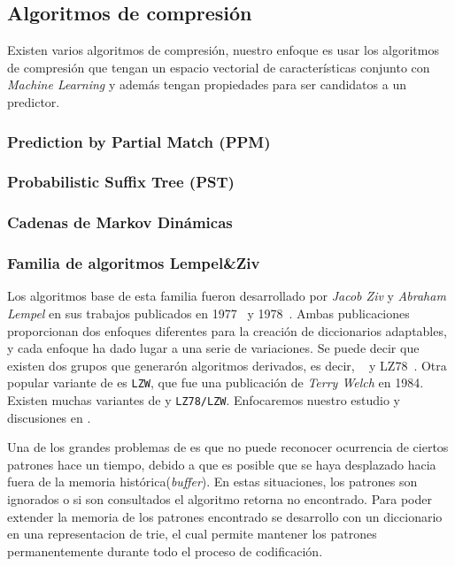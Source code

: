 \uncm
\subsection{Algoritmos de compresión}

Existen varios algoritmos de compresión, nuestro enfoque es usar los algoritmos de compresión que tengan un espacio vectorial de características conjunto con \emph{Machine Learning} y además tengan propiedades para ser candidatos a un predictor. 


\subsubsection{Prediction by Partial Match (PPM)}
	
 
\subsubsection{Probabilistic Suffix Tree (PST)}
 	

\subsubsection{Cadenas de Markov Dinámicas}
  	
 


\subsubsection{Familia de algoritmos Lempel\&Ziv}\label{ch2:sec-lzfamily}

 
Los algoritmos base de esta familia fueron desarrollado por \emph{Jacob Ziv} y \emph{Abraham Lempel} en sus trabajos publicados en 1977~\cite{ZivLempel1977} y 1978~\cite{ZivLempel1978}. Ambas publicaciones proporcionan dos enfoques diferentes para la creación de diccionarios adaptables, y cada enfoque ha dado lugar a una serie de variaciones. Se puede decir que existen dos grupos que generarón algoritmos derivados, es decir, \lzSieteSiete~\cite{ZivLempel1977} y LZ78~\cite{ZivLempel1978}. Otra popular variante  de \lzSieteOcho es \texttt{LZW}, que fue una publicación de \emph{Terry Welch} en 1984. Existen muchas variantes de \lzSieteSiete y \texttt{LZ78/LZW}. Enfocaremos nuestro estudio y discusiones en \lzSieteOcho. 


Una de los grandes problemas de \lzSieteSiete es que no puede reconocer ocurrencia de ciertos patrones hace un tiempo, debido a que es posible que se haya desplazado hacia fuera de la memoria histórica(\emph{buffer}). En estas situaciones, los patrones son ignorados o si son consultados el algoritmo retorna no encontrado. Para poder extender la memoria de los patrones encontrado se desarrollo \lzSieteOcho con un diccionario en una representacion de trie, el cual permite mantener los patrones permanentemente durante todo el proceso de codificación.




